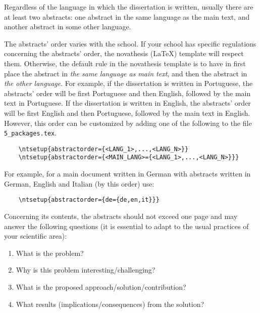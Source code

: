 
%

Regardless of the language in which the dissertation is written, usually there are at least two abstracts: one abstract in the same language as the main text, and another abstract in some other language.

The abstracts' order varies with the school.
If your school has specific regulations concerning the abstracts'
order, the \gls{novathesis} (\LaTeX) template will respect them.
Otherwise,
the default rule in the \gls{novathesis} template is
to have in first place the abstract in \emph{the same language as main text},
and then the abstract in \emph{the other language}.
For example, if the dissertation is written in Portuguese,
the abstracts' order will be first Portuguese and then English,
followed by the main text in Portuguese.
If the dissertation is written in English, the abstracts' order will be first English and then Portuguese,
followed by the main text in English.
%
However, this order can be customized by adding one of the following to the file \verb+5_packages.tex+.

\begin{verbatim}
    \ntsetup{abstractorder={<LANG_1>,...,<LANG_N>}}
    \ntsetup{abstractorder={<MAIN_LANG>={<LANG_1>,...,<LANG_N>}}}
\end{verbatim}

For example, for a main document written in German with abstracts written in German, English and Italian (by this order) use:
\begin{verbatim}
    \ntsetup{abstractorder={de={de,en,it}}}
\end{verbatim}

Concerning its contents, the abstracts should not exceed one page and may answer the following questions (it is essential to adapt to the usual practices of your scientific area):

\begin{enumerate}
  \item What is the problem?
  \item Why is this problem interesting/challenging?
  \item What is the proposed approach/solution/contribution?
  \item What results (implications/consequences) from the solution?
\end{enumerate}


